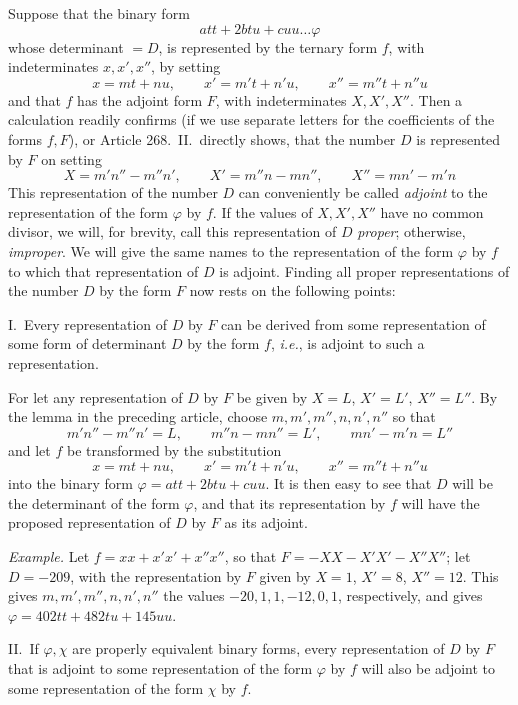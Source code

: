Suppose that the binary form
\[
att+2btu+cuu\ldots\varphi
\]
whose determinant $=D$, is represented by the ternary form $f$, with
indeterminates $x,x',x''$, by setting
\[
x=mt+nu,\qquad x'=m't+n'u,\qquad x''=m''t+n''u
\]
and that $f$ has the adjoint form $F$, with indeterminates $X,X',X''$.
Then a calculation readily confirms (if we use separate letters for the
coefficients of the forms $f,F$), or Article 268.\ II.\ directly shows,
that the number $D$ is represented by $F$ on setting
\[
X=m'n''-m''n',\qquad X'=m''n-mn'',\qquad X''=mn'-m'n
\]
This representation of the number $D$ can conveniently be called
\textit{adjoint} to the representation of the form $\varphi$ by $f$.
If the values of $X,X',X''$ have no common divisor, we will, for brevity,
call this representation of $D$ \textit{proper}; otherwise,
\textit{improper}. We will give the same names to the representation of
the form $\varphi$ by $f$ to which that representation of $D$ is
adjoint. Finding all proper representations of the number $D$ by
the form $F$ now rests on the following points:

I.\ Every representation of $D$ by $F$ can be derived from some
representation of some form of determinant $D$ by the form $f$,
\textit{i.e.}, is adjoint to such a representation.

For let any representation of $D$ by $F$ be given by $X=L$, $X'=L'$,
$X''=L''$. By the lemma in the preceding article, choose $m,m',m'',n,n',n''$ so that
\[
m'n''-m''n'=L,\qquad m''n-mn''=L',\qquad mn'-m'n=L''
\]
and let $f$ be transformed by the substitution
\[
x=mt+nu,\qquad x'=m't+n'u,\qquad x''=m''t+n''u
\]
into the binary form $\varphi=att+2btu+cuu$. It is then easy to see that $D$ will be
the determinant of the form $\varphi$, and that its representation by $f$
will have the proposed representation of $D$ by $F$ as its adjoint.

\textit{Example.} Let $f=xx+x'x'+x''x''$, so that $F=-XX-X'X'-X''X''$;
let $D=-209$, with the representation by $F$ given by $X=1$, $X'=8$, $X''=12$.
This gives $m,m',m'',n,n',n''$ the values $-20,1,1,-12,0,1$, respectively, and gives $\varphi=402tt+482tu+145uu$.

II.\ If $\varphi,\chi$ are properly equivalent binary forms, every representation
of $D$ by $F$ that is adjoint to some representation of the form
$\varphi$ by $f$ will also be adjoint to some representation of the form
$\chi$ by $f$.


